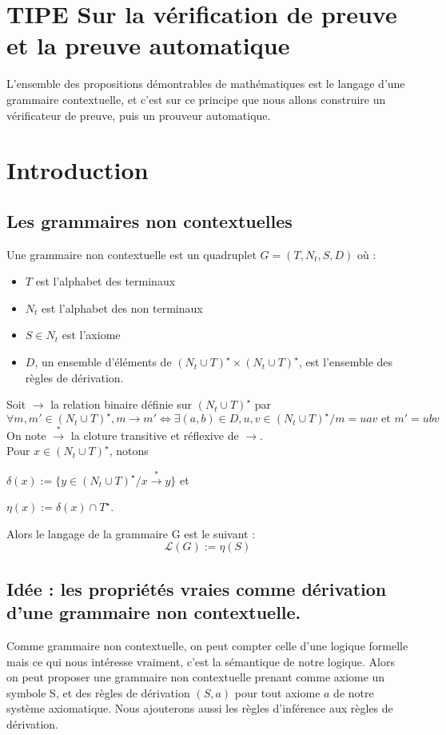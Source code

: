 \documentclass[a4paper,10pt]{article}
\title{\letitle}
\author{\leauthor}
\date{}
\begin{document}
    \section{TIPE Sur la vérification de preuve et la preuve automatique}
L'ensemble des propositions démontrables de mathématiques est le langage d'une grammaire contextuelle, et c'est 
sur ce principe que nous allons construire un vérificateur de preuve, 
puis un prouveur automatique.

\section{Introduction}

\subsection{Les grammaires non contextuelles}

Une grammaire non contextuelle est un quadruplet $G = (T,N_t,S,D)$ où :

\begin{itemize}
\item $T$ est l'alphabet des terminaux
\item $N_t$ est l'alphabet des non terminaux
\item $S \in N_t$ est l'axiome
\item $D$, un ensemble d'éléments de $(N_t \cup T)^\star \times (N_t \cup T)^\star$, est l'ensemble des règles de dérivation.
\end{itemize}

Soit $\rightarrow$ la relation binaire définie sur $(N_t \cup T)^\star$ par
\begin{equation}
\forall m,m' \in (N_t \cup T)^\star, m \rightarrow m' \iff \exists (a,b) \in D, u,v \in (N_t \cup T)^\star / m = uav \text{ et } m' = ubv
\end{equation}
On note $\overset{*}{\rightarrow}$ la cloture transitive et réflexive de $\rightarrow$.\\
Pour $x \in (N_t \cup T)^\star$, notons

$\delta(x) := \{y \in (N_t \cup T)^\star / x \overset{*}{\rightarrow} y\}$
et 

$\eta(x) := \delta(x) \cap T^\star$.

Alors le langage de la grammaire G est le suivant :
\begin{equation*}\mathcal{L} (G) := \eta(S)\end{equation*}

\subsection{Idée : les propriétés vraies comme dérivation d'une grammaire non contextuelle.}
Comme grammaire non contextuelle, on peut compter celle d'une logique formelle mais ce qui 
nous intéresse vraiment, c'est la sémantique de notre logique.
Alors on peut proposer une grammaire non contextuelle prenant comme axiome un symbole S,
et des règles de dérivation $(S,a)$ pour tout axiome $a$ de notre système axiomatique.
Nous ajouterons aussi les règles d'inférence aux règles de dérivation.
\end{document}
